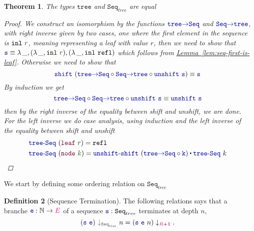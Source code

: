 \documentclass[twoside,11pt,openright]{report}
\theoremstyle{plain} %
\newtheorem{thm}{Theorem}[section]
\theoremstyle{definition}
\newtheorem{defn}[thm]{Definition}%
\theoremstyle{remark}
\newcommand*{\lemref}[1]{\hyperref[lem:#1]{Lemma~\ref*{lem:#1}}}
\newcommand*{\term}[1]{\textcolor{green!30!black}{#1}} %
\newcommand*{\type}[1]{\textcolor{magenta!90!black}{#1}}
\newcommand*{\unit}{\type{\textbf{1}}}
\newcommand*{\relation}[1]{\textcolor{gray!75!black}{\ensuremath{\mathtt{#1}}}}
\newcommand*{\function}[1]{\textcolor{blue!60!black}{\ensuremath{\mathtt{#1}}}}
\newcommand*{\constructor}[1]{\textcolor{purple!60!black}{\ensuremath{\mathtt{#1}}}}
\newcommand*{\typeformer}[1]{\ensuremath{\mathtt{#1}}}
\newcommand{\ct}{%
  \mathchoice{\mathbin{\raisebox{0.5ex}{$\displaystyle\centerdot$}}}%
             {\mathbin{\raisebox{0.5ex}{$\centerdot$}}}%
             {\mathbin{\raisebox{0.25ex}{$\scriptstyle\,\centerdot\,$}}}%
             {\mathbin{\raisebox{0.1ex}{$\scriptscriptstyle\,\centerdot\,$}}}
}
\begin{document}
\begin{thm}
  The types \(\typeformer{tree}\) and \(\typeformer{Seq}_{tree}\) are equal
  \begin{proof}
    We construct an isomorphism by the functions \(\function{tree{\rightarrow}Seq}\) and \(\function{Seq{\rightarrow}tree}\), with right inverse given by two cases, one where the first element in the sequence is \(\mathtt{inl}~\term{r}\), meaning representing a leaf with value \(r\), then we need to show that \(\function{s} \equiv \lambda\,\_,(\lambda\,\_,\mathtt{inl}~\term{r}),(\lambda\,\_,\mathtt{inl}~\mathtt{refl})\) which follows from \lemref{seq-first-is-leaf}. Otherwise we need to show that
    \begin{equation}
      \function{shift}~(\function{tree{\rightarrow}Seq} \circ \function{Seq{\rightarrow}tree} \circ \function{unshift}~\function{s}) \equiv \function{s}
    \end{equation}
    By induction we get
    \begin{equation}
      \function{tree{\rightarrow}Seq} \circ \function{Seq{\rightarrow}tree} \circ \function{unshift}~\function{s} \equiv \function{unshift}~\function{s}
    \end{equation}
    then by the right inverse of the equality between shift and unshift, we are done. For the left inverse we do case analysis, using induction and the left inverse of the equality between shift and unshift
    \begin{equation}
      \begin{aligned}
        &\function{tree\text{-}Seq}~(\constructor{leaf}~\term{r}) = \mathtt{refl} \\
        &\function{tree\text{-}Seq}~(\constructor{node}~\term{k}) = \function{unshift\text{-}shift}~(\function{tree{\rightarrow}Seq} \circ \function{k}) \ct \function{tree\text{-}Seq}~k
      \end{aligned}
    \end{equation}
  \end{proof}
\end{thm}
\noindent We start by defining some ordering relation on \(\typeformer{Seq}_{tree}\)
\begin{defn}[Sequence Termination]
  The following relations says that a branche \(\function{e} : \mathbb{N} \rightarrow \type{E}\) of a sequence \(\function{s} : \typeformer{Seq}_{tree}\) terminates at depth \(n\),
  \begin{equation}
    (\function{s}~\function{e})~\relation{\downarrow_{\typeformer{Seq}_{tree}}}~n = (\function{s}~\function{e}~n) \downarrow_{\type{R} + \unit}.
  \end{equation}
\end{defn}
\end{document}
